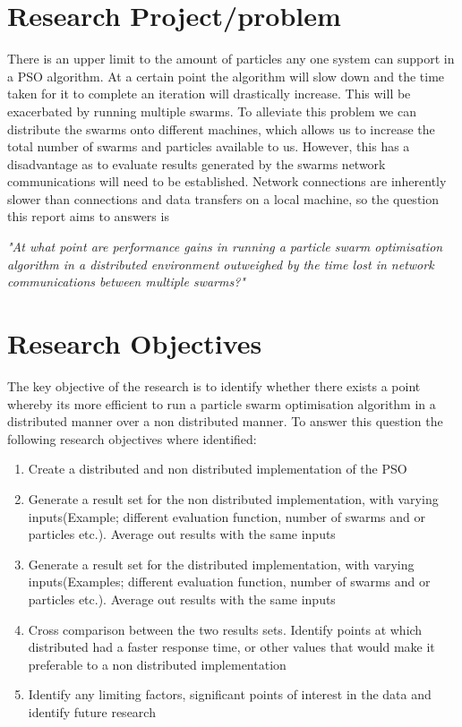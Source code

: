 \documentclass[oneside,12pt]{book}
\begin{document}
\section{Research Project/problem}
There is an upper limit to the amount of particles any one system can support in a PSO algorithm. At a certain point the algorithm will slow down and the time taken for it to complete an iteration will drastically increase. This will be exacerbated by running multiple swarms. 
To alleviate this problem we can distribute the swarms onto different machines, which allows us to increase the total number of swarms and particles available to us. However, this has a disadvantage as to evaluate results generated by the swarms network communications will need to be established. Network connections are inherently slower than connections and data transfers on a local machine, so the question this report aims to answers is

\textit{"At what point are performance gains in running a particle swarm optimisation algorithm in a distributed environment outweighed by the time lost in network communications between multiple swarms?"}

\section{Research Objectives}
The key objective  of  the  research  is  to  identify  whether  there exists a point whereby its more efficient to run a particle swarm optimisation algorithm in a distributed manner over a non distributed manner. To answer this question the following research objectives where identified:
\begin{enumerate}
\item Create a distributed and non distributed implementation of the PSO
\item Generate a result set for the non distributed implementation, with varying inputs(Example; different evaluation function, number of swarms and or particles etc.). Average out results with the same inputs
\item Generate a result set for the distributed implementation, with varying inputs(Examples; different evaluation function, number of swarms and or particles etc.). Average out results with the same inputs
\item Cross comparison between the two results sets. Identify points at which distributed had a faster response time, or other values that would make it preferable to  a non distributed implementation
\item Identify any limiting factors, significant points of interest in the data and identify future research
\end{enumerate}
\end{document}
